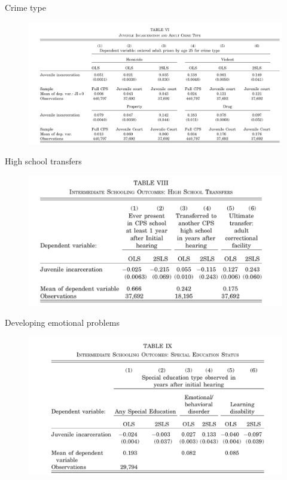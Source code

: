 \documentclass{beamer}
\begin{document}
\begin{frame}{Crime type}
	
	\begin{figure}
	\includegraphics[scale=0.2]{./lecture_includes/crimetype.png}
	\end{figure}
\end{frame}


\begin{frame}{High school transfers}
	
	\begin{figure}
	\includegraphics[scale=0.2]{./lecture_includes/transfers.png}
	\end{figure}
\end{frame}


\begin{frame}{Developing emotional problems}
	
	\begin{figure}
	\includegraphics[scale=0.2]{./lecture_includes/disorder.png}
	\end{figure}
\end{frame}
\end{document}
